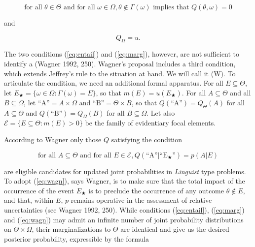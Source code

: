\documentclass[12pt]{article}
\begin{document}
\begin{equation}
  \label{eq:entail}
  \mbox{for all }\theta\in\Theta\mbox{ and for all
  }\omega\in\Omega,\theta\notin\Gamma(\omega)\mbox{ implies that }Q(\theta,\omega)=0
\end{equation}

and

\begin{equation}
  \label{eq:marg}
  Q_{\Omega}=u.
\end{equation}

The two conditions (\ref{eq:entail}) and (\ref{eq:marg}), however, are
not sufficient to identify a  (Wagner 1992, 250). Wagner's proposal includes a third
condition, which extends Jeffrey's rule to the situation at hand. We
will call it (W). To articulate the condition, we need an additional
formal apparatus. For all $E\subseteq{}\Theta$, let
$E_{\bigstar}=\{\omega\in\Omega:\Gamma(\omega)=E\}$, so that
$m(E)=u(E_{\bigstar})$. For all $A\subseteq\Theta$ and all
$B\subseteq\Omega$, let $\mbox{``A''}=A\times\Omega$ and
$\mbox{``B''}=\Theta\times{}B$, so that
$Q(\mbox{``A''})=Q_{\Theta}(A)$ for all $A\subseteq\Theta$ and
$Q(\mbox{``B''})=Q_{\Omega}(B)$ for all $B\subseteq\Omega$. Let also
$\mathcal{E}=\{E\subseteq\Theta:m(E)>0\}$ be the family of evidentiary
focal elements.

According to Wagner only those $Q$ satisfying the condition

\begin{equation}
  \label{eq:wagn}
  \mbox{for all }A\subseteq\Theta\mbox{ and for all }E\in\mathcal{E},Q(\mbox{``A''}|\mbox{``E$_{\bigstar}$''})=p(A|E)
\end{equation}

are eligible candidates for updated joint probabilities in
\emph{Linguist} type problems. 
To adopt (\ref{eq:wagn}), says Wagner, is to make sure that the total
impact of the occurrence of the event $E_{\bigstar}$ is to preclude
the occurrence of any outcome $\theta\notin{}E$, and that, within $E$,
$p$ remains operative in the assessment of relative uncertainties (see
Wagner 1992, 250). While conditions (\ref{eq:entail}), (\ref{eq:marg})
and (\ref{eq:wagn}) may admit an infinite number of joint probability
distributions on $\Theta\times\Omega$, their marginalizations to
$\Theta$ are identical and give us the desired posterior probability,
expressible by the formula
\end{document}
